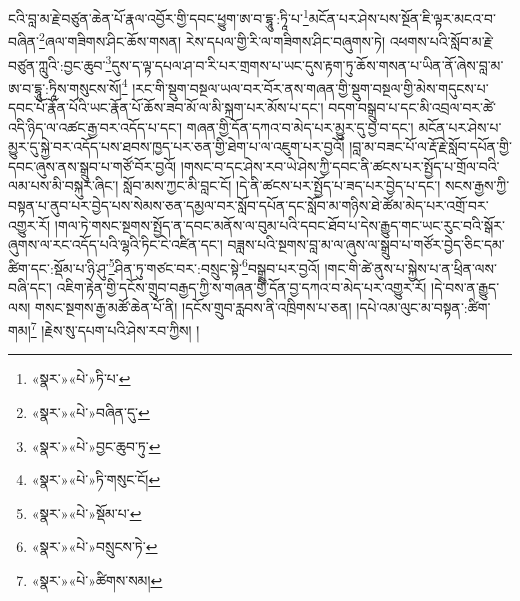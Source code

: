 ངའི་བླ་མ་རྗེ་བཙུན་ཆེན་པོ་རྣལ་འབྱོར་གྱི་དབང་ཕྱུག་ཨ་བ་དྷཱུ་:ཏཱི་པ་\footnote{«སྣར་»«པེ་»ཏི་པ་}མངོན་པར་ཤེས་པས་སྔོན་ཇི་ལྟར་མངའ་བ་བཞིན་\footnote{«སྣར་»«པེ་»བཞིན་དུ་}ཞལ་གཟིགས་ཤིང་ཆོས་གསན། རེས་དཔལ་གྱི་རི་ལ་གཟིགས་ཤིང་བཞུགས་ཏེ། འཕགས་པའི་སློབ་མ་རྗེ་བཙུན་ཀླུའི་:བྱང་ཆུབ་\footnote{«སྣར་»«པེ་»བྱང་ཆུབ་ཏུ་}དུས་ད་ལྟ་དཔལ་ཤ་བ་རི་པར་གྲགས་པ་ཡང་དུས་རྟག་ཏུ་ཆོས་གསན་པ་ཡིན་ནོ་ཞེས་བླ་མ་ཨ་བ་དྷཱུ་:ཏཱིས་གསུངས་སོ།\footnote{«སྣར་»«པེ་»ཏི་གསུང་ངོ།} །རང་གི་སྡུག་བསྔལ་ཡལ་བར་བོར་ནས་གཞན་གྱི་སྡུག་བསྔལ་གྱི་མེས་གདུངས་པ་དབང་པོ་རྣོན་པོའི་ཡང་རྣོན་པོ་ཆོས་ཟབ་མོ་ལ་མི་སྐྲག་པར་མོས་པ་དང་། བདག་བསྒྲུབ་པ་དང་མི་འབྲལ་བར་ཚེ་འདི་ཉིད་ལ་འཚང་རྒྱ་བར་འདོད་པ་དང་། གཞན་གྱི་དོན་དཀའ་བ་མེད་པར་མྱུར་དུ་བྱ་བ་དང་། མངོན་པར་ཤེས་པ་མྱུར་དུ་སྐྱེ་བར་འདོད་པས་ཐབས་ཁྱད་པར་ཅན་གྱི་ཐེག་པ་ལ་འཇུག་པར་བྱའོ། །བླ་མ་བཟང་པོ་ལ་རྡོ་རྗེ་སློབ་དཔོན་གྱི་དབང་ཞུས་ནས་སྒྲུབ་པ་གཙོ་བོར་བྱའོ། །གསང་བ་དང་ཤེས་རབ་ཡེ་ཤེས་ཀྱི་དབང་ནི་ཚངས་པར་སྤྱོད་པ་གྲོལ་བའི་ལམ་པས་མི་བསྐུར་ཞིང་། སློབ་མས་ཀྱང་མི་བླང་ངོ། །དེ་ནི་ཚངས་པར་སྤྱོད་པ་ཟད་པར་བྱེད་པ་དང་། སངས་རྒྱས་ཀྱི་བསྟན་པ་ནུབ་པར་བྱེད་པས་སེམས་ཅན་དམྱལ་བར་སློབ་དཔོན་དང་སློབ་མ་གཉིས་ཐེ་ཚོམ་མེད་པར་འགྲོ་བར་འགྱུར་རོ། །གལ་ཏེ་གསང་སྔགས་སྤྱོད་ན་དབང་མནོས་ལ་བུམ་པའི་དབང་ཐོབ་པ་དེས་རྒྱུད་གང་ཡང་རུང་བའི་སྒོར་ཞུགས་ལ་རང་འདོད་པའི་ལྷའི་ཏིང་ངེ་འཛིན་དང་། བཟླས་པའི་སྔགས་བླ་མ་ལ་ཞུས་ལ་སྒྲུབ་པ་གཙོར་བྱེད་ཅིང་དམ་ཚིག་དང་:སྡོམ་པ་ཉི་ཤུ་\footnote{«སྣར་»«པེ་»སྡོམ་པ་}ཤིན་ཏུ་གཙང་བར་:བསྲུང་སྟེ་\footnote{«སྣར་»«པེ་»བསྲུངས་ཏེ་}བསྒྲུབ་པར་བྱའོ། །གང་གི་ཚེ་ནུས་པ་སྐྱེས་པ་ན་ཕྲིན་ལས་བཞི་དང་། འཇིག་རྟེན་གྱི་དངོས་གྲུབ་བརྒྱད་ཀྱི་ས་གཞན་གྱི་དོན་བྱ་དཀའ་བ་མེད་པར་འགྱུར་རོ། །དེ་བས་ན་རྒྱུད་ལས། གསང་སྔགས་རྒྱ་མཚོ་ཆེན་པོ་ནི། །དངོས་གྲུབ་རླབས་ནི་འཁྲིགས་པ་ཅན། །དཔེ་འམ་ལུང་མ་བསྟན་:ཚིག་གམ།\footnote{«སྣར་»«པེ་»ཚིགས་སམ།} །རྗེས་སུ་དཔག་པའི་ཤེས་རབ་ཀྱིས། །
